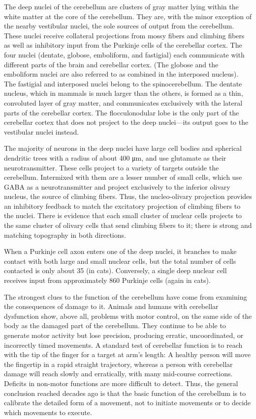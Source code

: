 \documentclass[]{book}
\begin{document}
The deep nuclei of the cerebellum are clusters of gray matter lying within the white matter at the core of the cerebellum. They are, with the minor exception of the nearby vestibular nuclei, the sole sources of output from the cerebellum. These nuclei receive collateral projections from mossy fibers and climbing fibers as well as inhibitory input from the Purkinje cells of the cerebellar cortex. The four nuclei (dentate, globose, emboliform, and fastigial) each communicate with different parts of the brain and cerebellar cortex. (The globose and the emboliform nuclei are also referred to as combined in the interposed nucleus). The fastigial and interposed nuclei belong to the spinocerebellum. The dentate nucleus, which in mammals is much larger than the others, is formed as a thin, convoluted layer of gray matter, and communicates exclusively with the lateral parts of the cerebellar cortex. The flocculonodular lobe is the only part of the cerebellar cortex that does not project to the deep nuclei---its output goes to the vestibular nuclei instead.

The majority of neurons in the deep nuclei have large cell bodies and spherical dendritic trees with a radius of about 400 μm, and use glutamate as their neurotransmitter. These cells project to a variety of targets outside the cerebellum. Intermixed with them are a lesser number of small cells, which use GABA as a neurotransmitter and project exclusively to the inferior olivary nucleus, the source of climbing fibers. Thus, the nucleo-olivary projection provides an inhibitory feedback to match the excitatory projection of climbing fibers to the nuclei. There is evidence that each small cluster of nuclear cells projects to the same cluster of olivary cells that send climbing fibers to it; there is strong and matching topography in both directions.

When a Purkinje cell axon enters one of the deep nuclei, it branches to make contact with both large and small nuclear cells, but the total number of cells contacted is only about 35 (in cats). Conversely, a single deep nuclear cell receives input from approximately 860 Purkinje cells (again in cats).

The strongest clues to the function of the cerebellum have come from examining the consequences of damage to it. Animals and humans with cerebellar dysfunction show, above all, problems with motor control, on the same side of the body as the damaged part of the cerebellum. They continue to be able to generate motor activity but lose precision, producing erratic, uncoordinated, or incorrectly timed movements. A standard test of cerebellar function is to reach with the tip of the finger for a target at arm's length: A healthy person will move the fingertip in a rapid straight trajectory, whereas a person with cerebellar damage will reach slowly and erratically, with many mid-course corrections. Deficits in non-motor functions are more difficult to detect. Thus, the general conclusion reached decades ago is that the basic function of the cerebellum is to calibrate the detailed form of a movement, not to initiate movements or to decide which movements to execute.
\end{document}
